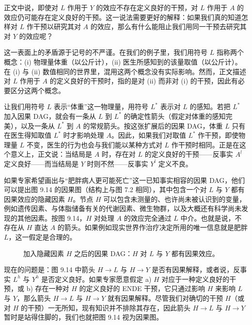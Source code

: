 \begin{finepoint}[干预是否定义良好取决于所关心的结局]
正文中说，即使对 $L$ 作用于 $Y$ 的效应不存在定义良好的干预，对 $L$ 作用于 $A$ 的效应仍可能存在定义良好的干预。这一说法需要更好的解释：如果我们真的知道怎样对 $L$ 作干预以研究其对 $A$ 的效应，那么有什么能阻止我们用同一干预去研究其对 $Y$ 的效应呢？

这一表面上的矛盾源于记号的不严谨。在我们的例子里，我们用符号 $L$ 指称两个概念：(i) 物理量体重（以公斤计），(ii) 医生所感知到的该量取值（以公斤计）。在 (i) 与 (ii) 数值相同的世界里，混用这两个概念没有实际影响。然而，正文描述对 $L$ 作用于 $A$ 的定义良好的干预时，指的是对 (ii) 而非对 (i) 的干预，因此有必要区分这两个概念。

让我们用符号 $L$ 表示“体重”这一物理量，用符号 $L^{*}$ 表示对 $L$ 的感知。若把 $L^{*}$ 加入因果 DAG，就会有一条从 $L$ 到 $L^{*}$ 的确定性箭头（假定对体重的感知完美），以及一条从 $L^{*}$ 到 $A$ 的常规箭头。按这张扩展后的因果 DAG，体重 $L$ 只有在医生得知取值 $L^{*}$ 时才影响处理 $A$。因此，如果我们对取值 $L^{*}$ 作干预，即使物理量 $L$ 不变，医生的行为也会与我们能以某种方式对 $L$ 作干预时相同。正是在这个意义上，正文说：当结局是 $A$ 时，存在对 $L$ 的定义良好的干预——反事实 $A^{l}$ 定义良好——而当结局是 $Y$ 时则不然——反事实 $Y^{l}$ 定义不良。
\end{finepoint}

如果专家希望画出与“肥胖病人更可能死亡”这一已知事实相容的因果 DAG，他们可以提出图 9.14 的因果图（结构上与图 7.2 相同），其中包含一个对 $L$ 与 $Y$ 都有因果效应的隐藏因素 $H$。节点 $H$ 可以包含未测量的、也许尚未被认识到的变量，例如遗传因素、与体脂储备有关的代谢因素、微生物群，以及大概还有科学尚未发现的其他因素。按图 9.14，$H$ 对处理 $A$ 的效应完全通过 $L$ 中介。也就是说，不存在从 $H$ 直达 $A$ 的箭头。如果例如现实世界作治疗决定所用的唯一信息就是肥胖 $L$，这一假定是合理的。

\begin{figure}[htbp]
\centering
{}
\caption{加入隐藏因素 $H$ 之后的因果 DAG：$H$ 对 $L$ 与 $Y$ 都有因果效应。}
\label{fig:9.14}
\end{figure}

现在的问题是：图 9.14 中箭头 $H\rightarrow L$ 与 $H\rightarrow Y$ 是否有因果解释，或者说，反事实 $L^{h}$ 与 $Y^{h}$ 是否定义良好。如果专家愿意假定 a) $H$ 对应于一种定义良好的干预，或 b) 存在一种对 $H$ 的定义良好的 ENDE 干预，它只通过影响 $H$ 来影响 $L$ 与 $Y$，那么箭头 $H\rightarrow L$ 与 $H\rightarrow Y$ 就有因果解释。尽管我们对确切的干预 $H$（或对 $H$ 的干预）一无所知，现有知识并不排除其存在，因此箭头 $H\rightarrow L$ 与 $H\rightarrow Y$ 暂时是站得住脚的，我们也就把图 9.14 视为因果图。

